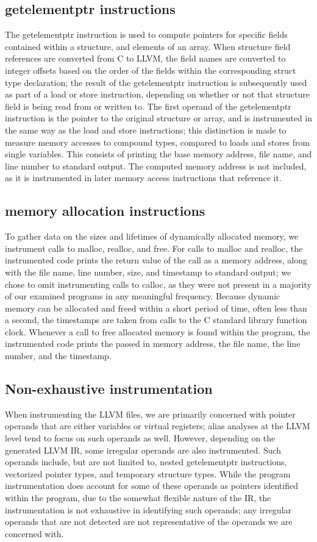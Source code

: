\subsection{getelementptr instructions}
The getelementptr instruction is used to compute pointers for specific fields contained within a structure, and elements of an array. When structure field references are converted from C to LLVM, the field names are converted to integer offsets based on the order of the fields within the corresponding struct type declaration; the result of the getelementptr instruction is subsequently used as part of a load or store instruction, depending on whether or not that structure field is being read from or written to. The first operand of the getelementptr instruction is the pointer to the original structure or array, and is instrumented in the same way as the load and store instructions; this distinction is made to measure memory accesses to compound types, compared to loads and stores from single variables. This consists of printing the base memory address, file name, and line number to standard output. The computed memory address is not included, as it is instrumented in later memory access instructions that reference it.

\subsection{memory allocation instructions}
To gather data on the sizes and lifetimes of dynamically allocated memory, we instrument calls to malloc, realloc, and free. For calls to malloc and realloc, the instrumented code prints the return value of the call as a memory address, along with the file name, line number, size, and timestamp to standard output; we chose to omit instrumenting calls to calloc, as they were not present in a majority of our examined programs in any meaningful frequency. Because dynamic memory can be allocated and freed within a short period of time, often less than a second, the timestamps are taken from calls to the C standard library function clock. Whenever a call to free allocated memory is found within the program, the instrumented code prints the passed in memory address, the file name, the line number, and the timestamp.

\subsection{Non-exhaustive instrumentation}
When instrumenting the LLVM files, we are primarily concerned with pointer operands that are either variables or virtual registers; alias analyses at the LLVM level tend to focus on such operands as well. However, depending on the generated LLVM IR, some irregular operands are also instrumented. Such operands include, but are not limited to, nested getelementptr instructions, vectorized pointer types, and temporary structure types. While the program instrumentation does account for some of these operands as pointers identified within the program, due to the somewhat flexible nature of the IR, the instrumentation is not exhaustive in identifying such operands; any irregular operands that are not detected are not representative of the operands we are concerned with.
